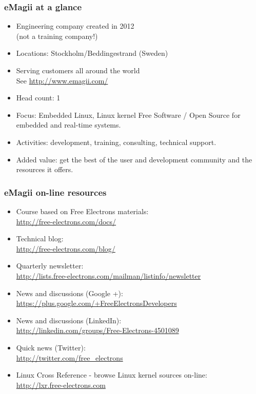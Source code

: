 \begin{frame}
\frametitle{eMagii at a glance}
  \begin{itemize}
    \item Engineering company created in 2012 \\
          (not a training company!)
    \item Locations: Stockholm/Beddingestrand (Sweden)
    \item Serving customers all around the world \\
          See \url{http://www.emagii.com/}
    \item Head count: 1
    \item Focus: Embedded Linux, Linux kernel
          Free Software / Open Source
          for embedded and real-time systems.
    \item Activities: development, training, consulting, technical
          support.
    \item Added value: get the best of the user and development
          community and the resources it offers.
  \end{itemize}
\end{frame}

\begin{frame}
\frametitle{eMagii on-line resources}
  \begin{itemize}
    \item Course based on Free Electrons materials:\\
          \url{http://free-electrons.com/docs/}
    \item Technical blog:\\
          \url{http://free-electrons.com/blog/}
    \item Quarterly newsletter:\\
	  \url{http://lists.free-electrons.com/mailman/listinfo/newsletter}
    \item News and discussions (Google +):\\
	  \url{https://plus.google.com/+FreeElectronsDevelopers}
    \item News and discussions (LinkedIn):\\
	  \url{http://linkedin.com/groups/Free-Electrons-4501089}
    \item Quick news (Twitter):\\
          \url{http://twitter.com/free_electrons}
    \item Linux Cross Reference - browse Linux kernel sources on-line:\\
          \url{http://lxr.free-electrons.com}
  \end{itemize}
\end{frame}
